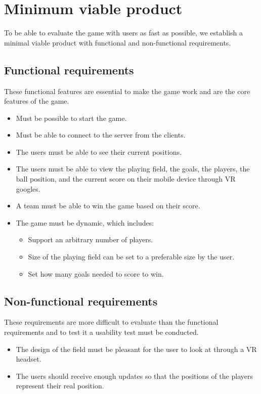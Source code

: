 \section{Minimum viable product}
To be able to evaluate the game with users as fast as possible, we establish a minimal viable product with functional and non-functional requirements.

\subsection{Functional requirements}
These functional features are essential to make the game work and are the core features of the game.

\begin{itemize}
    \item Must be possible to start the game.
    \item Must be able to connect to the server from the clients.
    \item The users must be able to see their current positions.
    \item The users must be able to view the playing field, the goals, the players, the ball position, and the current score on their mobile device through VR googles.
    \item A team must be able to win the game based on their score.
    \item The game must be dynamic, which includes:
          \begin{itemize}
              \item Support an arbitrary number of players.
              \item Size of the playing field can be set to a preferable size by the user.
              \item Set how many goals needed to score to win.
          \end{itemize}
\end{itemize}

\subsection{Non-functional requirements}
These requirements are more difficult to evaluate than the functional requirements and to test it a usability test must be conducted.
\begin{itemize}
    \item The design of the field must be pleasant for the user to look at through a VR headset.
    \item The users should receive enough updates so that the positions of the players represent their real position.
\end{itemize}
